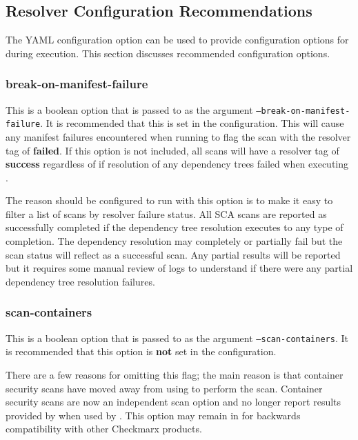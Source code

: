 



\subsection{Resolver Configuration Recommendations}

The YAML configuration option  can be used to provide
configuration options for \scaresolver during execution.  This section discusses recommended
configuration options.

\subsubsection{break-on-manifest-failure}\label{sec:break-manifest}

This is a boolean option that is passed to \scaresolver as the argument \texttt{--break-on-manifest-failure}.  It is recommended
that this is set in the  configuration.  This will cause any manifest failures
encountered when running \scaresolver to flag the scan with the resolver tag of \textbf{failed}.  If this option is not included,
all scans will have a resolver tag of \textbf{success} regardless of if resolution of any dependency trees failed when
executing \scaresolverns.

The reason \scaresolver should be configured to run with this option is to make it easy to filter a list of scans by resolver
failure status.  All SCA scans are reported as successfully completed if the dependency tree resolution executes to
any type of completion.  The dependency resolution may completely or partially fail but the scan status will reflect
as a successful scan.  Any partial results will be reported but it requires some manual review of logs to understand if there
were any partial dependency tree resolution failures.

\subsubsection{scan-containers}
This is a boolean option that is passed to \scaresolver as the argument \texttt{--scan-containers}.  It is recommended that
this option is \textbf{not} set in the  configuration.

There are a few reasons for omitting this flag; the main reason is that container security scans have moved away from
using \scaresolver to perform the scan.  Container security scans are now an independent scan option and no longer
report results provided by \scaresolver when used by \cxonens.  This option may remain in \scaresolver for backwards
compatibility with other Checkmarx products.


